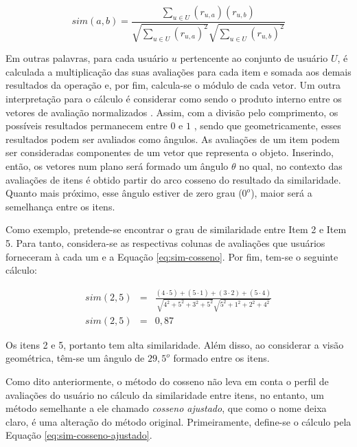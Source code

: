         \begin{equation} 
            sim(a, b) = \frac{\sum_{u\in U}(r_{u, a})(r_{u, b})}{\sqrt{\sum_{u\in U}(r_{u, a})^2}\sqrt{\sum_{u\in U}(r_{u, b})^2}} \label{eq:sim-cosseno}
        \end{equation}    
    
        Em outras palavras, para cada usuário $u$ pertencente ao conjunto de usuário $U$, é calculada a multiplicação das suas avaliações para cada item e somada aos demais resultados da operação e, por fim, calcula-se o módulo de cada vetor. Um outra interpretação para o cálculo é considerar como sendo o produto interno entre os vetores de avaliação normalizados \cite{Jones1987}. Assim, com a divisão pelo comprimento, os possíveis resultados permanecem entre $0$ e $1$ \cite{Jannach2010}, sendo que geometricamente, esses resultados podem ser avaliados como ângulos. As avaliações de um item podem ser consideradas componentes de um vetor que representa o objeto. Inserindo, então, os vetores num plano será formado um ângulo $\theta$ no qual, no contexto das avaliações de itens é obtido partir do arco cosseno do resultado da similaridade. Quanto mais próximo, esse ângulo estiver de zero grau ($0^o$), maior será a semelhança entre os itens.
        
        Como exemplo, pretende-se encontrar o grau de similaridade entre Item 2 e Item 5. Para tanto, considera-se as respectivas colunas de avaliações que usuários forneceram à cada um e a Equação \ref{eq:sim-cosseno}. Por fim, tem-se o seguinte cálculo:
        
        \begin{eqnarray}
            sim(2, 5) &=& \frac{(4\cdot 5)+(5\cdot 1)+(3\cdot 2)+(5 \cdot 4)}{\sqrt{4^2+5^2+3^2+5^2}\sqrt{5^2+1^2+2^2+4^2}} \nonumber \\
            sim(2, 5) &=& 0,87 \nonumber
        \end{eqnarray}
        
        Os itens 2 e 5, portanto tem alta similaridade. Além disso, ao considerar a visão geométrica, têm-se um ângulo de $29,5^o$ formado entre os itens.
    
        Como dito anteriormente, o método do cosseno não leva em conta o perfil de avaliações do usuário no cálculo da similaridade entre itens, no entanto, um método semelhante a ele chamado \textit{cosseno ajustado}, que como o nome deixa claro, é uma alteração do método original. Primeiramente, define-se o cálculo pela Equação \ref{eq:sim-cosseno-ajustado}.
        
